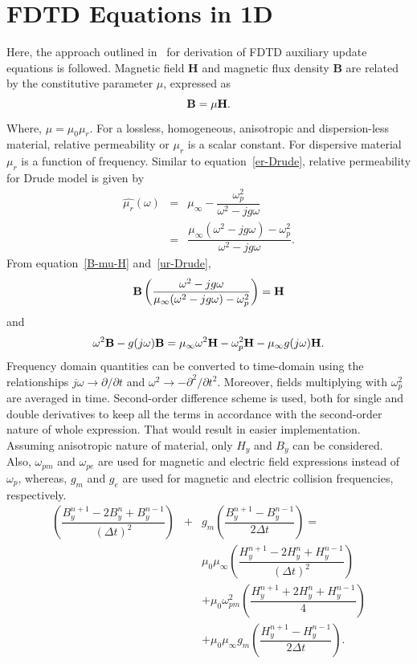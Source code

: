 \section{FDTD Equations in 1D}
Here, the approach outlined in~\cite{Radial-Zhao} for derivation of FDTD auxiliary update equations is followed. Magnetic field $\textbf{H}$ and magnetic flux density $\textbf{B}$ are related by the constitutive parameter $\mu$, expressed as
\begin{equation}
\centering
\textbf{B} = \mu \textbf{H}.
\label{B-mu-H}
\end{equation}
Where, $\mu = \mu_0 \mu_r$. For a lossless, homogeneous, anisotropic and dispersion-less material, relative permeability or $\mu_r$ is a scalar constant. For dispersive material $\mu_r$ is a function of frequency. Similar to equation~\ref{er-Drude}, relative permeability for Drude model is given by
\begin{eqnarray}
\nonumber \hat{\mu_r}(\omega)&=&\mu_\infty-\dfrac{\omega^2_p}{\omega^2-jg\omega}\\
&=&\dfrac{\mu_\infty(\omega^2-jg\omega)-\omega^2_p}{\omega^2-jg\omega}.
\label{ur-Drude}
\end{eqnarray}
From equation~\ref{B-mu-H} and~\ref{ur-Drude},
\begin{equation}
\centering
\nonumber \textbf{B} \left( \dfrac{\omega^2-jg\omega}{\mu_\infty(\omega^2-jg\omega)-\omega^2_p} \right) =\textbf{H}
\label{B-muomega-H}
\end{equation}
and
\begin{equation}
\centering
\omega^2\textbf{B}-g(j\omega)\textbf{B} = \mu_\infty\omega^2\textbf{H}-\omega^2_p\textbf{H}-\mu_\infty g(j\omega)\textbf{H}.
\label{B-muomega-H-frequency-domain}
\end{equation}
Frequency domain quantities can be converted to time-domain using the relationships $j\omega \rightarrow \partial/\partial t$ and $\omega^2 \rightarrow - \partial^2/\partial t^2$. Moreover, fields multiplying with $\omega^2_p$ are averaged in time. Second-order difference scheme is used, both for single and double derivatives to keep all the terms in accordance with the second-order nature of whole expression. That would result in easier implementation. Assuming anisotropic nature of material, only $H_y$ and $B_y$ can be considered. Also, $\omega_{pm}$ and $\omega_{pe}$ are used for magnetic and electric field expressions instead of $\omega_p$, whereas, $g_m$ and $g_e$ are used for magnetic and electric collision frequencies, respectively.
\begin{eqnarray}
\nonumber \left(\dfrac{B^{n+1}_y-2B^n_y+B^{n-1}_y}{(\Delta t)^2}\right) &+& g_m\left(\dfrac{B^{n+1}_y-B^{n-1}_y}{2\Delta t}\right) =\\
\nonumber &&\mu_0\mu_\infty\left(\dfrac{H^{n+1}_y-2H^n_y+H^{n-1}_y}{(\Delta t)^2}\right)\\
\nonumber &&+\mu_0\omega^2_{pm}\left(\dfrac{H^{n+1}_y+2H^n_y+H^{n-1}_y}{4}\right)\\
&&+\mu_0\mu_\infty g_m\left(\dfrac{H^{n+1}_y-H^{n-1}_y}{2\Delta t}\right).
\label{2nd-order-B-H}
\end{eqnarray}
